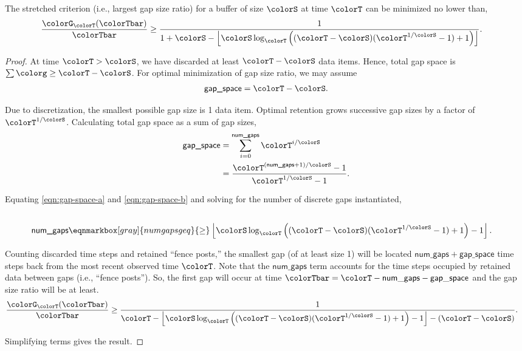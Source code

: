 \begin{lemma}
\label{thm:stretched-ideal-strict}
The stretched criterion (i.e., largest gap size ratio) for a buffer of size $\colorS$ at time $\colorT$ can be minimized no lower than,
\begin{align*}
\frac{\colorG_{\colorT}(\colorTbar)}{\colorTbar}
&\geq
\frac{
  1
}{
  1 + \colorS
  - \left\lfloor \colorS \log_{\colorT}\Big(
    (\colorT - \colorS)(\colorT^{1/\colorS} - 1) + 1
  \Big)\right\rfloor
}.
\end{align*}
\end{lemma}

\begin{proof}
At time $\colorT > \colorS$, we have discarded at least $\colorT - \colorS$ data items.
Hence, total gap space is $\sum \colorg \geq \colorT - \colorS$.
For optimal minimization of gap size ratio, we may assume
\begin{align}
\textsf{gap\_space} = \colorT - \colorS.
\label{eqn:gap-space-a}
\end{align}

Due to discretization, the smallest possible gap size is 1 data item.
Optimal retention grows successive gap sizes by a factor of $\colorT^{1/\colorS}$.
Calculating total gap space as a sum of gap sizes,
\begin{align}
\textsf{gap\_space}
&=
\sum_{i = 0}^{\textsf{num\_gaps}} \colorT^{i/\colorS} %
\nonumber \\
&=
\frac{
  \colorT^{(\textsf{num\_gaps} + 1)/\colorS} - 1
}{
  \colorT^{1/\colorS} - 1
}.
\label{eqn:gap-space-b}
\end{align}

Equating \ref{eqn:gap-space-a} and \ref{eqn:gap-space-b} and solving for the number of discrete gaps instantiated,
\begin{align*}
\\
\textsf{num\_gaps}
&\eqnmarkbox[gray]{numgapsgeq}{\geq}
\left\lfloor
\colorS \log_{\colorT}\Big(
  (\colorT - \colorS)(\colorT^{1/\colorS} - 1) + 1
\Big) - 1
\right\rfloor.
\end{align*}


Counting discarded time steps and retained ``fence posts,'' the smallest gap (of at least size 1) will be located $\mathsf{num\_gaps} + \mathsf{gap\_space}$ time steps back from the most recent observed time $\colorT$.
Note that the $\mathsf{num\_gaps}$ term accounts for the time steps occupied by retained data between gaps (i.e., ``fence posts'').
So, the first gap will occur at time $\colorTbar = \colorT - \mathsf{num\_gaps} - \mathsf{gap\_space}$ and the gap size ratio will be at least.
\begin{align*}
\frac{\colorG_{\colorT}(\colorTbar)}{\colorTbar}
&\geq
\frac{1}{
\colorT
- \left\lfloor
\colorS \log_{\colorT}\Big(
  (\colorT - \colorS)(\colorT^{1/\colorS} - 1) + 1
\Big) - 1
\right\rfloor - (\colorT - \colorS)
}.
\end{align*}

Simplifying terms gives the result.
\end{proof}
